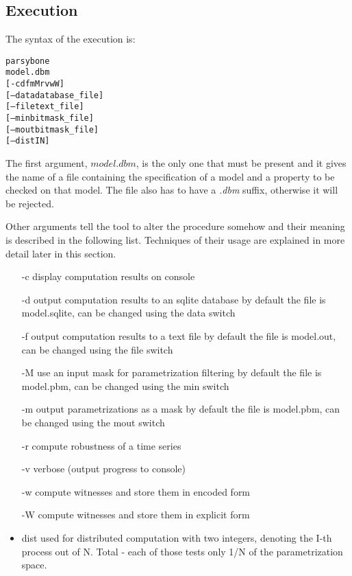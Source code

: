 \documentclass[12pt]{article}
\begin{document}
\subsection{Execution}
The syntax of the execution is:
\begin{alltt}
parsybone 
	model.dbm 
	[-cdfmMrvwW] 
	[--data database_file] 
	[--file text_file]  
	[--min bitmask_file] 
	[--mout bitmask_file]  
	[--dist I N]
\end{alltt}
The first argument, $model.dbm$, is the only one that must be present and it gives the name of a file containing the specification of a model and a property to be checked on that model. The file also has to have a \emph{.dbm} suffix, otherwise it will be rejected.

Other arguments tell the tool to alter the procedure somehow and their meaning is described in the following list. Techniques of their usage are explained in more detail later in this section.
\begin{itemize}
\item [-c]	display computation results on console
\item [-d] output computation results to an sqlite database
		by default the file is model.sqlite, can be changed using the {\verb --data } switch
\item [-f] output computation results to a text file
		by default the file is model.out, can be changed using the {\verb --file } switch
\item [-M] use an input mask for parametrization filtering
		by default the file is model.pbm, can be changed using the {\verb --min } switch
\item [-m] output parametrizations as a mask
		by default the file is model.pbm, can be changed using the {\verb --mout } switch
\item [-r] compute robustness of a time series
\item [-v] verbose (output progress to console)
\item [-w] compute witnesses and store them in encoded form
\item [-W] compute witnesses and store them in explicit form
	
\item {\verb --dist } used for distributed computation with two integers, denoting the I-th process out of N. Total - each of those tests only 1/N of the parametrization space.
\end{itemize}
\end{document}

